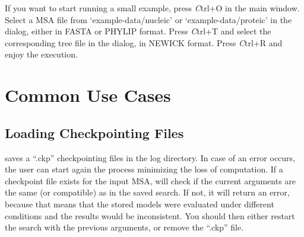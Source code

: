 \documentclass[10pt,twoside,a4paper]{article}
\begin{document}
If you want to start running a small example, press {\emph Ctrl+O} in the main window.
Select a MSA file from `example-data/nucleic' or `example-data/proteic' in the dialog, either in FASTA or PHYLIP format.
Press {\emph Ctrl+T} and select the corresponding tree file in the dialog, in NEWICK format.
Press {\emph Ctrl+R} and enjoy the execution.





\section{Common Use Cases}

\subsection{Loading Checkpointing Files}
\label{sec:ckp}

\modeltest saves a ``.ckp'' checkpointing files in the log directory. In case of an error occurs,
the user can start again the process minimizing the loss of computation.
If a checkpoint file exists for the input MSA, \modeltest will check if the current arguments
are the same (or compatible) as in the saved search.
If not, it will return an error, because that means that the stored models were evaluated under
different conditions and the results would be inconsistent.
You should then either restart the search with the previous arguments,
or remove the ``.ckp'' file.








%
%
%
%
%

\end{document}

